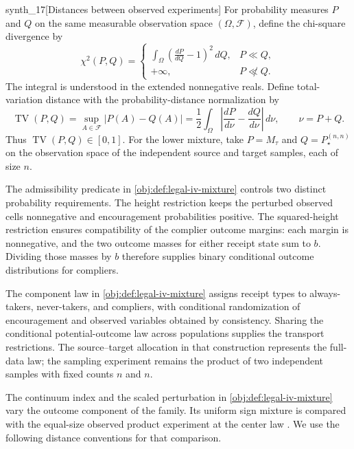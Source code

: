 \documentclass[11pt]{article}
\begin{document}
\begin{definitionv}{synth_17}[Distances between observed experiments]
For probability measures \(P\) and \(Q\) on the same measurable observation space \((\Omega,\mathcal F)\), define the chi-square divergence by
\[
\chi^2(P,Q)=
\begin{cases}
\displaystyle\int_\Omega
\left(\frac{dP}{dQ}-1\right)^2\,dQ,&P\ll Q,\\
+\infty,&P\not\ll Q.
\end{cases}
\]
The integral is understood in the extended nonnegative reals. Define total-variation distance with the probability-distance normalization by
\[
\operatorname{TV}(P,Q)
=\sup_{A\in\mathcal F}|P(A)-Q(A)|
=\frac12\int_\Omega
\left|\frac{dP}{d\nu}-\frac{dQ}{d\nu}\right|\,d\nu,
\qquad \nu=P+Q.
\]
Thus \(\operatorname{TV}(P,Q)\in[0,1]\). For the lower mixture, take \(P=M_\tau\) and \(Q=P_\star^{(n,n)}\) on the observation space of the independent source and target samples, each of size \(n\).
\end{definitionv}

The admissibility predicate  in \cref{obj:def:legal-iv-mixture} controls two distinct probability requirements. The height restriction keeps the perturbed observed cells nonnegative and encouragement probabilities positive. The squared-height restriction ensures compatibility of the complier outcome margins: each margin is nonnegative, and the two outcome masses for either receipt state sum to \(b\). Dividing those masses by \(b\) therefore supplies binary conditional outcome distributions for compliers.

The component law  in \cref{obj:def:legal-iv-mixture} assigns receipt types to always-takers, never-takers, and compliers, with conditional randomization of encouragement and observed variables obtained by consistency. Sharing the conditional potential-outcome law across populations supplies the transport restrictions. The source--target allocation in that construction represents the full-data law; the sampling experiment remains the product of two independent samples with fixed counts \(n\) and \(n\).

The continuum index  and the scaled perturbation  in \cref{obj:def:legal-iv-mixture} vary the outcome component of the family. Its uniform sign mixture  is compared with the equal-size observed product experiment at the center law . We use the following distance conventions for that comparison.
\end{document}
